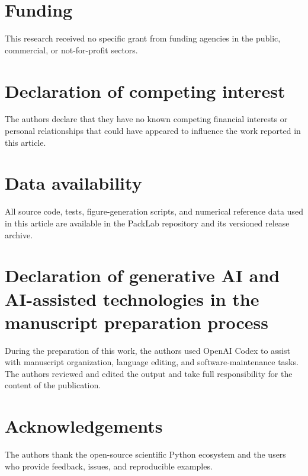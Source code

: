 \documentclass[preprint,12pt]{elsarticle}
\begin{document}
\section*{Funding}

This research received no specific grant from funding agencies in the public, commercial, or not-for-profit sectors. %

\section*{Declaration of competing interest}

The authors declare that they have no known competing financial interests or personal relationships that could have appeared to influence the work reported in this article. %

\section*{Data availability}

All source code, tests, figure-generation scripts, and numerical reference data used in this article are available in the PackLab repository and its versioned release archive. %

\section*{Declaration of generative AI and AI-assisted technologies in the manuscript preparation process}

During the preparation of this work, the authors used OpenAI Codex to assist with manuscript organization, language editing, and software-maintenance tasks. %
The authors reviewed and edited the output and take full responsibility for the content of the publication. %

\section*{Acknowledgements}

The authors thank the open-source scientific Python ecosystem and the users who provide feedback, issues, and reproducible examples. %



\end{document}
